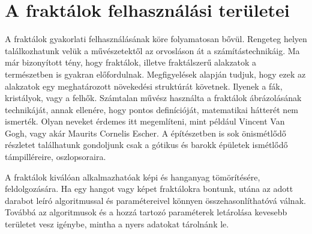\section*{A fraktálok felhasználási területei}
A fraktálok gyakorlati felhasználásának köre folyamatosan bővül. Rengeteg helyen találkozhatunk velük a művészetektől az orvosláson át a számítástechnikáig. Ma már bizonyított tény, hogy fraktálok, illetve fraktálszerű alakzatok a természetben is gyakran előfordulnak. Megfigyelések alapján tudjuk, hogy ezek az alakzatok egy meghatározott növekedési struktúrát követnek. Ilyenek a fák, kristályok, vagy a felhők. Számtalan művész használta a fraktálok ábrázolásának technikáját, annak ellenére, hogy pontos definícióját, matematikai hátterét nem ismerték.
Olyan neveket érdemes itt megemlíteni, mint például Vincent Van Gogh, vagy akár Maurits Cornelis Escher. A építészetben is sok önismétlődő részletet találhatunk gondoljunk csak a gótikus és barokk épületek ismétlődő támpilléreire, oszlopsoraira. 
\par A fraktálok kiválóan alkalmazhatóak képi és hanganyag tömörítésére, feldolgozására. Ha egy hangot vagy képet fraktálokra bontunk, utána az adott darabot leíró algoritmussal és paramétereivel könnyen összehasonlíthatóvá válnak. Továbbá az algoritmusok és a hozzá tartozó paraméterek letárolása kevesebb területet vesz igénybe, mintha a nyers adatokat tárolnánk le.